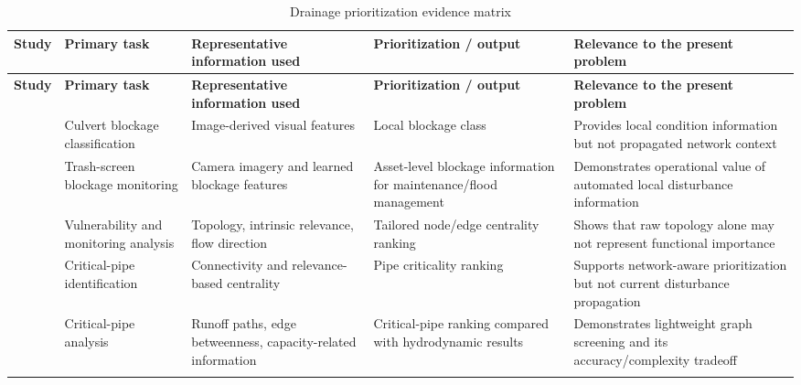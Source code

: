 {\small
\renewcommand{\arraystretch}{1.15}
\begin{longtable}{@{}>{\raggedright\arraybackslash}p{0.14\dimexpr\linewidth-8\tabcolsep\relax}
                     >{\raggedright\arraybackslash}p{0.17\dimexpr\linewidth-8\tabcolsep\relax}
                     >{\raggedright\arraybackslash}p{0.23\dimexpr\linewidth-8\tabcolsep\relax}
                     >{\raggedright\arraybackslash}p{0.22\dimexpr\linewidth-8\tabcolsep\relax}
                     >{\raggedright\arraybackslash}p{0.24\dimexpr\linewidth-8\tabcolsep\relax}@{}}
\caption{Drainage prioritization evidence matrix}\label{tab:evidence-matrix}\\
\toprule
\textbf{Study} & \textbf{Primary task} & \textbf{Representative information used} & \textbf{Prioritization / output} & \textbf{Relevance to the present problem} \\
\midrule
\endfirsthead
\toprule
\textbf{Study} & \textbf{Primary task} & \textbf{Representative information used} & \textbf{Prioritization / output} & \textbf{Relevance to the present problem} \\
\midrule
\endhead
\bottomrule
\endlastfoot

\citet{iqbal2021} &
Culvert blockage classification &
Image-derived visual features &
Local blockage class &
Provides local condition information but not propagated network context \\
\addlinespace

\citet{vandaele2024} &
Trash-screen blockage monitoring &
Camera imagery and learned blockage features &
Asset-level blockage information for maintenance/flood management &
Demonstrates operational value of automated local disturbance information \\
\addlinespace

\citet{simone2022} &
Vulnerability and monitoring analysis &
Topology, intrinsic relevance, flow direction &
Tailored node/edge centrality ranking &
Shows that raw topology alone may not represent functional importance \\
\addlinespace

\citet{simone2023} &
Critical-pipe identification &
Connectivity and relevance-based centrality &
Pipe criticality ranking &
Supports network-aware prioritization but not current disturbance propagation \\
\addlinespace

\citet{dastgir2023} &
Critical-pipe analysis &
Runoff paths, edge betweenness, capacity-related information &
Critical-pipe ranking compared with hydrodynamic results &
Demonstrates lightweight graph screening and its accuracy/complexity tradeoff \\
\addlinespace


\end{longtable}}
